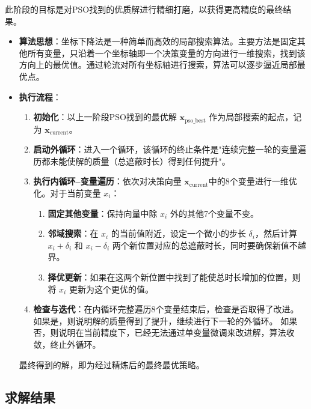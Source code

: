 \documentclass[5pt, withoutpreface,bwprint]{cumcmthesis} %
\begin{document}
     此阶段的目标是对PSO找到的优质解进行精细打磨，以获得更高精度的最终结果。
     
     \begin{itemize}
         \item \textbf{算法思想}：坐标下降法是一种简单而高效的局部搜索算法。主要方法是固定其他所有变量，只沿着一个坐标轴即一个决策变量的方向进行一维搜索，找到该方向上的最优值。通过轮流对所有坐标轴进行搜索，算法可以逐步逼近局部最优点。
     
         \item \textbf{执行流程}：
         \begin{enumerate}
             \item \textbf{初始化}：以上一阶段PSO找到的最优解 $\boldsymbol{x}_{\text{pso\_best}}$ 作为局部搜索的起点，记为 $\boldsymbol{x}_{\text{current}}$。
             
             \item \textbf{启动外循环}：进入一个循环，该循环的终止条件是"连续完整一轮的变量遍历都未能使解的质量（总遮蔽时长）得到任何提升"。
     
             \item \textbf{执行内循环--变量遍历}：依次对决策向量 $\boldsymbol{x}_{\text{current}}$中的8个变量进行一维优化。对于当前变量 $x_i$：
                 \begin{enumerate}
                     \item \textbf{固定其他变量}：保持向量中除 $x_i$ 外的其他7个变量不变。
                     \item \textbf{邻域搜索}：在 $x_i$ 的当前值附近，设定一个微小的步长 $\delta_i$，然后计算 $x_i + \delta_i$ 和 $x_i - \delta_i$ 两个新位置对应的总遮蔽时长，同时要确保新值不越界。
                     \item \textbf{择优更新}：如果在这两个新位置中找到了能使总时长增加的位置，则将 $x_i$ 更新为这个更优的值。
                 \end{enumerate}
     
             \item \textbf{检查与迭代}：在内循环完整遍历8个变量结束后，检查是否取得了改进。
                 如果是，则说明解的质量得到了提升，继续进行下一轮的外循环。
                     如果否，则说明在当前精度下，已经无法通过单变量微调来改进解，算法收敛，终止外循环。
                
         \end{enumerate}
         最终得到的解，即为经过精炼后的最终最优策略。
     \end{itemize}
     \subsection{求解结果}
  
\end{document}
